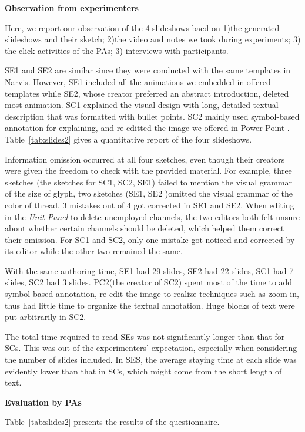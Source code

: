 \noindent
\textbf{Observation from experimenters}

Here, we report our observation of the 4 slideshows baed on 1)the generated slideshows and their sketch; 2)the video and notes we took during experiments; 3) the click activities of the PAs; 3) interviews with participants.

SE1 and SE2 are similar since they were conducted with the same templates in Narvis. However, SE1 included all the animations we embedded in offered templates while SE2, whose creator preferred an abstract introduction, deleted most animation. SC1 explained the visual design with long, detailed textual description that was formatted with bullet points. SC2 mainly used symbol-based annotation for explaining, and re-editted the image we offered in Power Point . Table~\ref{tab:slides2} gives a quantitative report of the four slideshows.

Information omission occurred at all four sketches, even though their creators were given the freedom to check with the provided material. For example, three sketches (the sketches for SC1, SC2, SE1) failed to mention the visual grammar of the size of glyph, two sketches (SE1, SE2 )omitted the visual grammar of the color of thread. 3 mistakes out of 4 got corrected in SE1 and SE2. When editing in the \textit{Unit Panel} to delete unemployed channels, the two editors both felt unsure about whether certain channels should be deleted, which helped them correct their omission. 
For SC1 and SC2, only one mistake got noticed and corrected by its editor while the other two remained the same.

With the same authoring time, SE1 had 29 slides, SE2 had 22 slides, SC1 had 7 slides, SC2 had 3 slides. PC2(the creator of SC2) spent most of the time to add symbol-based annotation, re-edit the image to realize techniques such as zoom-in, thus had little time to organize the textual annotation. Huge blocks of text were put arbitrarily in SC2.

The total time required to read SEs was not significantly longer than that for SCs. This was out of the experimenters' expectation, especially when considering the number of slides included. 
In SES, the average staying time at each slide was evidently lower than that in SCs, which might come from the short length of text. 

\noindent
\textbf{Evaluation by PAs}

Table~\ref{tab:slides2} presents the results of the questionnaire. 

